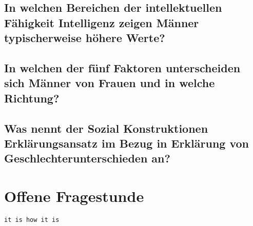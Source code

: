 \documentclass[a6paper,10pt,DIV=40]{scrartcl}
\begin{document}
\subsection{In welchen Bereichen der intellektuellen Fähigkeit Intelligenz zeigen Männer typischerweise höhere Werte?}
\subsection{In welchen der fünf Faktoren unterscheiden sich Männer von Frauen und in welche Richtung?}
\subsection{Was nennt der Sozial Konstruktionen Erklärungsansatz im Bezug in Erklärung von Geschlechterunterschieden an?}

\section{Offene Fragestunde}

\begin{Verbatim}[samepage=true, frame=single]
it is how it is
\end{Verbatim}
\end{document}
